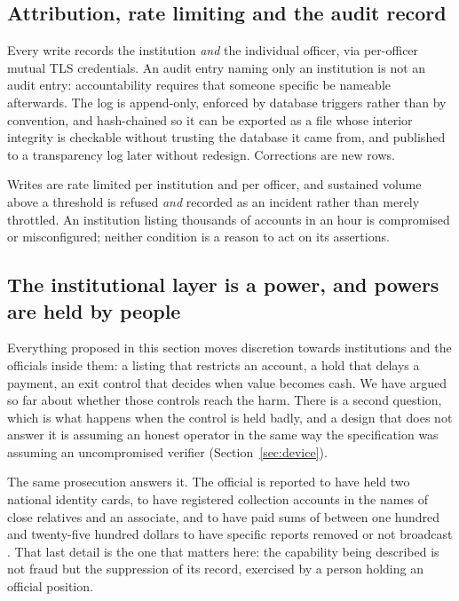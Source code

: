 \documentclass[10pt,a4paper,twocolumn]{article}
\begin{document}
\subsection{Attribution, rate limiting and the audit record}

Every write records the institution \emph{and} the individual officer, via
per-officer mutual TLS credentials. An audit entry naming only an institution is
not an audit entry: accountability requires that someone specific be nameable
afterwards. The log is append-only, enforced by database triggers rather than by
convention, and hash-chained so it can be exported as a file whose interior
integrity is checkable without trusting the database it came from, and published
to a transparency log later without redesign. Corrections are new rows.

Writes are rate limited per institution and per officer, and sustained volume
above a threshold is refused \emph{and} recorded as an incident rather than
merely throttled. An institution listing thousands of accounts in an hour is
compromised or misconfigured; neither condition is a reason to act on its
assertions.

\subsection{The institutional layer is a power, and powers are held by people}
\label{sec:integrity}

Everything proposed in this section moves discretion towards institutions and
the officials inside them: a listing that restricts an account, a hold that
delays a payment, an exit control that decides when value becomes cash. We have
argued so far about whether those controls reach the harm. There is a second
question, which is what happens when the control is held badly, and a design
that does not answer it is assuming an honest operator in the same way the
specification was assuming an uncompromised verifier
(Section~\ref{sec:device}).

The same prosecution answers it. The official is reported to have held two
national identity cards, to have registered collection accounts in the names of
close relatives and an associate, and to have paid sums of between one hundred
and twenty-five hundred dollars to have specific reports removed or not
broadcast \citep{cambodianess2026kohkong}. That last detail is the one that
matters here: the capability being described is not fraud but the suppression of
its record, exercised by a person holding an official position.
\end{document}
